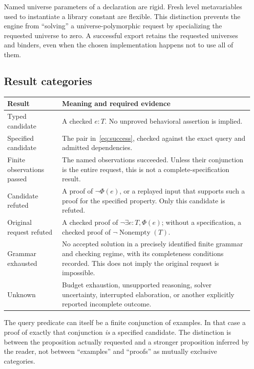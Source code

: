 \documentclass[11pt,letterpaper]{article}
\newcommand{\Spec}{\Phi}
\theoremstyle{definition}
\theoremstyle{remark}
\begin{document}
Named universe parameters of a declaration are rigid. Fresh level metavariables used to instantiate a library constant are flexible. This distinction prevents the engine from ``solving'' a universe-polymorphic request by specializing the requested universe to zero. A successful export retains the requested universes and binders, even when the chosen implementation happens not to use all of them.

\subsection{Result categories}

\begin{longtable}{@{}L{0.22\textwidth}L{0.72\textwidth}@{}}
\toprule
Result & Meaning and required evidence \\
\midrule
\endhead
Typed candidate & A checked $e:T$. No unproved behavioral assertion is implied. \\
Specified candidate & The pair in~\eqref{eq:success}, checked against the exact query and admitted dependencies. \\
Finite observations passed & The named observations succeeded. Unless their conjunction is the entire request, this is not a complete-specification result. \\
Candidate refuted & A proof of $\neg\Spec(e)$, or a replayed input that supports such a proof for the specified property. Only this candidate is refuted. \\
Original request refuted & A checked proof of $\neg\exists e:T,\Spec(e)$; without a specification, a checked proof of $\neg\operatorname{Nonempty}(T)$. \\
Grammar exhausted & No accepted solution in a precisely identified finite grammar and checking regime, with its completeness conditions recorded. This does not imply the original request is impossible. \\
Unknown & Budget exhaustion, unsupported reasoning, solver uncertainty, interrupted elaboration, or another explicitly reported incomplete outcome. \\
\bottomrule
\end{longtable}

The query predicate can itself be a finite conjunction of examples. In that case a proof of exactly that conjunction \emph{is} a specified candidate. The distinction is between the proposition actually requested and a stronger proposition inferred by the reader, not between ``examples'' and ``proofs'' as mutually exclusive categories.
\end{document}
